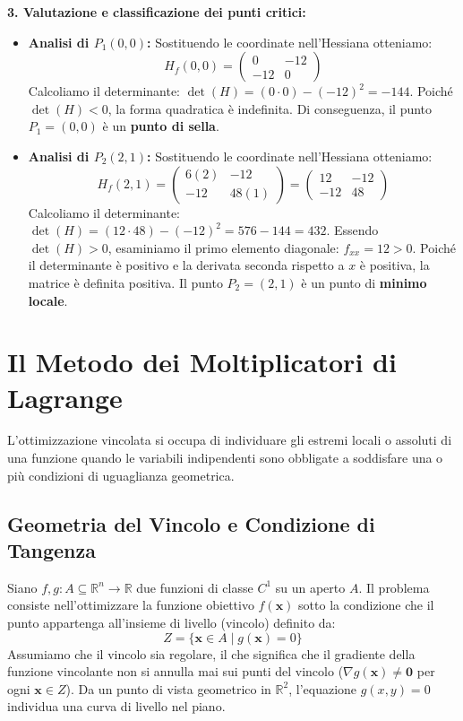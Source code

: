 \textbf{3. Valutazione e classificazione dei punti critici:}
\begin{itemize}
    \item \textbf{Analisi di $P_1(0,0)$:} Sostituendo le coordinate nell'Hessiana otteniamo:
    \[ H_f(0,0) = \begin{pmatrix} 0 & -12 \\ -12 & 0 \end{pmatrix} \]
    Calcoliamo il determinante: $\det(H) = (0 \cdot 0) - (-12)^2 = -144$. Poiché $\det(H) < 0$, la forma quadratica è indefinita. Di conseguenza, il punto $P_1 = (0,0)$ è un \textbf{punto di sella}.
    
    \item \textbf{Analisi di $P_2(2,1)$:} Sostituendo le coordinate nell'Hessiana otteniamo:
    \[ H_f(2,1) = \begin{pmatrix} 6(2) & -12 \\ -12 & 48(1) \end{pmatrix} = \begin{pmatrix} 12 & -12 \\ -12 & 48 \end{pmatrix} \]
    Calcoliamo il determinante: $\det(H) = (12 \cdot 48) - (-12)^2 = 576 - 144 = 432$. Essendo $\det(H) > 0$, esaminiamo il primo elemento diagonale: $f_{xx} = 12 > 0$. Poiché il determinante è positivo e la derivata seconda rispetto a $x$ è positiva, la matrice è definita positiva. Il punto $P_2 = (2,1)$ è un punto di \textbf{minimo locale}.
\end{itemize}


\section{Il Metodo dei Moltiplicatori di Lagrange}

L'ottimizzazione vincolata si occupa di individuare gli estremi locali o assoluti di una funzione quando le variabili indipendenti sono obbligate a soddisfare una o più condizioni di uguaglianza geometrica.

\subsection{Geometria del Vincolo e Condizione di Tangenza}
Siano $f, g: A \subseteq \mathbb{R}^n \to \mathbb{R}$ due funzioni di classe $C^1$ su un aperto $A$. Il problema consiste nell'ottimizzare la funzione obiettivo $f(\mathbf{x})$ sotto la condizione che il punto appartenga all'insieme di livello (vincolo) definito da:
\[ Z = \{ \mathbf{x} \in A \mid g(\mathbf{x}) = 0 \} \]
Assumiamo che il vincolo sia regolare, il che significa che il gradiente della funzione vincolante non si annulla mai sui punti del vincolo ($\nabla g(\mathbf{x}) \neq \mathbf{0}$ per ogni $\mathbf{x} \in Z$). Da un punto di vista geometrico in $\mathbb{R}^2$, l'equazione $g(x,y)=0$ individua una curva di livello nel piano. 

